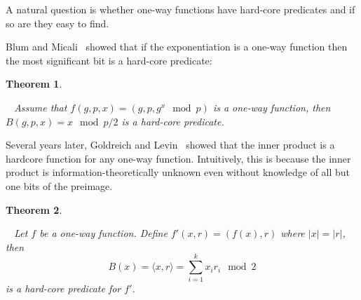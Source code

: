 \documentclass{article}
\newtheorem{thm}{Theorem}[section]
\newenvironment{theorem}{\begin{thm}\begin{rm}}%
{\end{rm}\end{thm}}
\begin{document}
A natural question is whether one-way functions have hard-core predicates and if so are they easy to find.

Blum and Micali~\cite{blumMicali82} showed that if the exponentiation is a one-way function then the most significant bit is a hard-core predicate:
\begin{theorem}~\cite{blumMicali82} Assume that $f(g,p,x) = (g,p, g^x\mod p)$ is a one-way function, then $B(g,p,x) = x \mod p/2$ is a hard-core predicate.
\end{theorem}
Several years later, Goldreich and Levin~\cite{goldreichLevin89} showed that the inner product is a hardcore function for any one-way function.  Intuitively, this is because the inner product is information-theoretically unknown even without knowledge of all but one bits of the preimage.  

\begin{theorem}~\cite{goldreichLevin89}
Let $f$ be a one-way function.  Define $f'(x, r) = (f(x), r)$ where $|x| = |r|$, then 
\[
B(x) = \langle x, r\rangle = \sum_{i=1}^k x_ir_i \mod 2
\] is a hard-core predicate for $f'$.
\end{theorem}


\end{document}
